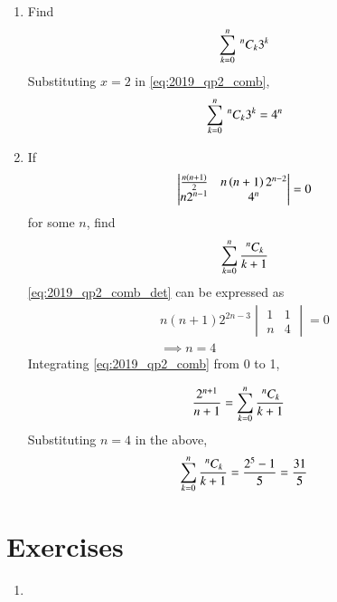 \documentclass[journal,12pt,twocolumn]{IEEEtran}
\renewcommand\thesection{\arabic{section}}
\begin{document}
\begin{enumerate}[label=\thesection.\arabic*
,ref=\thesection.\theenumi]
\item Find 
\begin{align}
\label{eq:2019_qp2_comb_3k}
\sum_{k=0}^{n}\,^{n}C_{k}3^k
\end{align}
\solution Substituting $x=2$ in \eqref{eq:2019_qp2_comb},
\begin{align}
\label{eq:2019_qp2_comb_3k_sol}
\sum_{k=0}^{n}\,^{n}C_{k}3^k = 4^n
\end{align}
\item If
\begin{align}
\label{eq:2019_qp2_comb_det}
\begin{vmatrix}
\frac{n(n+1)}{2} & n\left(n+1\right)2^{n-2}
\\
n2^{n-1} & 4^n
\end{vmatrix} = 0
\end{align}
for some $n$, find 
\begin{align}
\label{eq:2019_qp2_comb_det_prob}
\sum_{k=0}^{n}\frac{\,^{n}C_{k}}{k+1}
\end{align}
%
\solution \eqref{eq:2019_qp2_comb_det} can be expressed as
\begin{align}
\label{eq:2019_qp2_comb_det_sol}
n(n+1)2^{2n-3}
\begin{vmatrix}
1 & 1
\\
n & 4
\end{vmatrix} = 0
\\
\implies n = 4
\end{align}
%
Integrating \eqref{eq:2019_qp2_comb} from 0 to 1,

\begin{align}
\label{eq:2019_qp2_comb_int}
\frac{2^{n+1}}{n+1}&=\sum_{k=0}^{n}\frac{\,^{n}C_{k}}{k+1}
\end{align}
%
Substituting $n=4$ in the above, 
\begin{align}
\label{eq:2019_qp2_comb_int_sol}
\sum_{k=0}^{n}\frac{\,^{n}C_{k}}{k+1}= \frac{2^{5}-1}{5} = \frac{31}{5}
\end{align}
\end{enumerate}
\section{Exercises}
\begin{enumerate}[label=\arabic*.]
\item
\end{enumerate}
\end{document}
